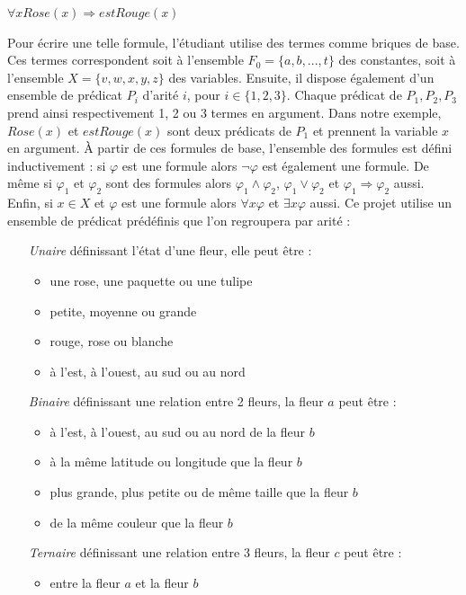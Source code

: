 \documentclass{article}
\theoremstyle{plain}
\theoremstyle{remark}
\begin{document}
\begin{center}
	$ \forall x Rose(x) \Rightarrow estRouge(x) $
\end{center}

Pour écrire une telle formule, l'étudiant utilise des termes comme
briques de base. Ces termes correspondent soit à l'ensemble $F_0=\{a,
b, ..., t\}$ des constantes, soit à l'ensemble $X=\{v, w, x, y, z\}$
des variables.  \newline Ensuite, il dispose également d'un ensemble
de prédicat $P_i$ d'arité $i$, pour $i\in \{1,2,3\}$. Chaque prédicat
de $P_1, P_2, P_3$ prend ainsi respectivement 1, 2 ou 3 termes en
argument. Dans notre exemple, $Rose(x)$ et $estRouge(x)$ sont deux
prédicats de $P_1$ et prennent la variable $x$ en argument.  \newline
\`A partir de ces formules de base, l'ensemble des formules est défini
inductivement : si $\varphi$ est une formule alors $\lnot \varphi$ est
également une formule. De même si $\varphi_1$ et $\varphi_2$ sont des
formules alors $\varphi_1 \land \varphi_2$, $\varphi_1 \lor \varphi_2$
et $\varphi_1 \Rightarrow \varphi_2$ aussi.  Enfin, si $x \in X$ et
$\varphi$ est une formule alors $\forall x \varphi$ et $\exists x
\varphi$ aussi.  \newline Ce projet utilise un ensemble de prédicat
prédéfinis que l'on regroupera par arité :
\begin{itemize}
	\item[\textit{Unaire}] définissant l'état d'une fleur, elle peut être :
		\begin{itemize}
			\item une rose, une paquette ou une tulipe
			\item petite, moyenne ou grande
			\item rouge, rose ou blanche
			\item à l'est, à l'ouest, au sud ou au nord
		\end{itemize}
              \item[\textit{Binaire}] définissant une relation entre 2
                fleurs, la fleur $a$ peut être :
		\begin{itemize}
                \item à l'est, à l'ouest, au sud ou au nord de la
                  fleur $b$
			\item à la même latitude ou longitude que la fleur $b$
			\item plus grande, plus petite ou de même
                          taille que la fleur $b$
			\item de la même couleur que la fleur $b$
		\end{itemize}
              \item[\textit{Ternaire}] définissant une relation entre
                3 fleurs, la fleur $c$ peut être :
		\begin{itemize}
                \item entre la fleur $a$ et la fleur $b$
		\end{itemize}
\end{itemize}
\end{document}
